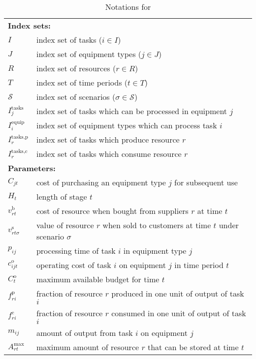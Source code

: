 \begin{table}[H]
	\caption{Notations for \chem}
	\label{chem:notation}
	\resizebox{\textwidth}{!}
	{
		\begin{tabular}{ll}
			\toprule
			\multicolumn{2}{l}{\textbf{Index sets:}} \\
			$I$ & index set of tasks ($i\in I$)\\ 
			$J$ & index set of equipment types ($j\in J$)\\ 
			$R$ & index set of resources ($r\in R$)\\ 
			$T$ & index set of time periods ($t\in T$)\\ 
			$\mathcal{S}$ & index set of scenarios ($\sigma\in \mathcal{S}$)\\
			$I_j^{\textrm{tasks}}$ & index set of tasks which can be processed in equipment $j$\\ 
			$I_i^{\textrm{equip}}$ & index set of equipment types which can process task $i$\\ 			
			$I_{r}^{\textrm{tasks,p}}$ & index set of tasks which produce resource $r$\\ 
			$I_{r}^{\textrm{tasks,c}}$ & index set of tasks which consume resource $r$\\
			\midrule
			\multicolumn{2}{l}{\textbf{Parameters:}} \\
			$C_{jt}$ & cost of purchasing an equipment type $j$ for subsequent use \\
			$H_t$ & length of stage $t$\\
			$v_{rt}^\textrm{b}$ & cost of resource when bought from suppliers $r$ at time $t$\\
			$v_{rt\sigma}^\textrm{s}$ & value of resource $r$ when sold to customers at time $t$ under scenario $\sigma$ \\		
			$p_{ij}$ & processing time of task $i$ in equipment type $j$\\
			$c_{ijt}^\textrm{o}$ & operating cost of task $i$ on equipment $j$ in time period $t$  \\
			$C_t^\textrm{o}$ & maximum available budget for time $t$\\
			$f_{ri}^{\textrm{p}}$ & fraction of resource $r$ produced in one unit of output of task $i$\\
			$f_{ri}^{\textrm{c}}$ & fraction of resource $r$ consumed in one unit of output of task $i$\\
			$m_{ij}$& amount of output from task $i$ on equipment $j$\\			
			$A_{rt}^{\textrm{max}}$& maximum amount of resource $r$ that can be stored at time $t$\\

\end{tabular}}
\end{table}
